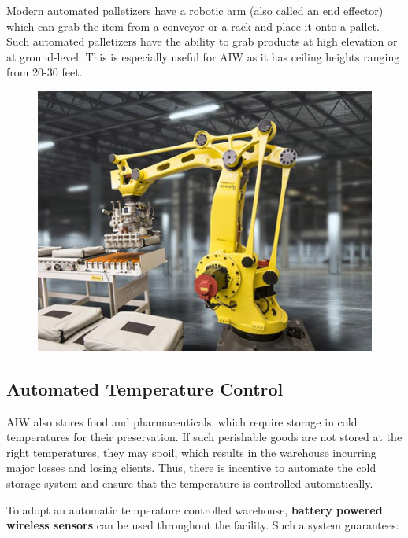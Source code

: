 \documentclass{report}
\begin{document}
\begin{itemize}
    Modern automated palletizers have a robotic arm (also called an end effector) which can grab the item from a conveyor or a rack and place it onto a pallet. Such automated palletizers have the ability to grab products at high elevation or at ground-level. This is especially useful for AIW as it has ceiling heights ranging from 20-30 feet. 
    
    \begin{figure}[H]
    
    \centering
    \includegraphics[scale=0.5]{pallet.jpg}
    \caption{}
    
    \end{figure}
    
\end{itemize}

\subsection{Automated Temperature Control}

AIW also stores food and pharmaceuticals, which require storage in cold temperatures for their preservation. If such perishable goods are not stored at the right temperatures, they may spoil, which results in the warehouse incurring major losses and losing clients. Thus, there is incentive to automate the cold storage system and ensure that the temperature is controlled automatically. 

To adopt an automatic temperature controlled warehouse, {\bfseries battery powered wireless sensors} can be used throughout the facility. Such a system guarantees:
\end{document}
